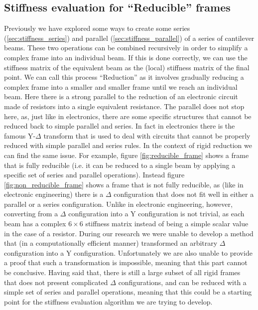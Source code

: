 \subsection{Stiffness evaluation for ``Reducible'' frames}

Previously we have explored some ways to create some series (\ref{sec:stiffness_series})
and parallel (\ref{sec:stiffness_parallel}) of a series of cantilever beams.
These two operations can be combined recursively in order to simplify a complex frame into 
an individual beam. If this is done correctly, we can use the stiffness matrix of the equivalent beam
as the (local) stiffness matrix of the final point.
We can call this process ``Reduction'' as it involves gradually reducing a complex frame into
a smaller and smaller frame until we reach an individual beam. Here there is a strong parallel
to the reduction of an electronic circuit made of resistors into a single equivalent resistance.
The parallel does not stop here, as, just like in electronics, there are some specific structures
that cannot be reduced back to simple parallel and series. In fact in electronics
there is the famous Y-$\Delta$ transform \cite{ydelta} that is used to deal with circuits
that cannot be properly reduced with simple parallel and series rules.
In the context of rigid reduction we can find the same issue. For example, figure
\ref{fig:reducible_frame} shows a frame that is fully reducible (i.e. it can be reduced
to a single beam by applying a specific set of series and parallel operations).
Instead figure \ref{fig:non_reducible_frame} shows a frame that is not fully reducible,
as (like in electronic engineering) there is a $\Delta$ configuration that does not fit
well in either a parallel or a series configuration.
Unlike in electronic engineering, however, converting from a $\Delta$ configuration into a Y
configuration is not trivial, as each beam has a complex $6 \times 6$ stiffness matrix
instead of being a simple scalar value in the case of a resistor.
During our research we were unable to develop a method that (in a computationally efficient manner)
transformed an arbitrary $\Delta$ configuration into a Y configuration.
Unfortunately we are also unable to provide a proof that such a transformation is impossible,
meaning that this part cannot be conclusive.
Having said that, there is still a large subset of all rigid frames that does not 
present complicated $\Delta$ configurations, and can be reduced with a simple set of 
series and parallel operations, meaning that this could be a starting point for the stiffness
evaluation algorithm we are trying to develop.



